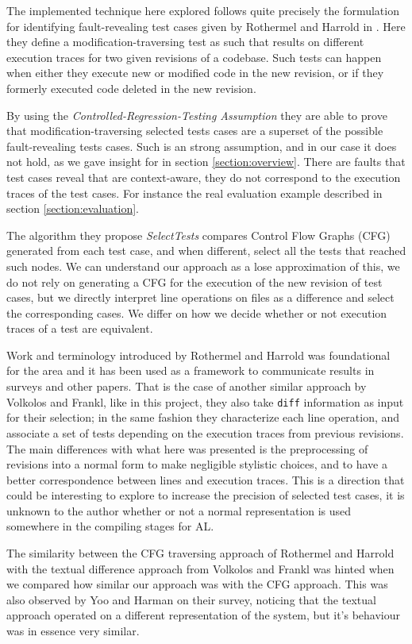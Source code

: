 \documentclass{article}
\begin{document}
The implemented technique here explored follows quite precisely the formulation for identifying fault-revealing test cases given by Rothermel and Harrold in \cite{TODO}. Here they define a modification-traversing test as such that results on different execution traces for two given revisions of a codebase. Such tests can happen when either they execute new or modified code in the new revision, or if they formerly executed code deleted in the new revision.

By using the \emph{Controlled-Regression-Testing Assumption} they are able to prove that modification-traversing selected tests cases are a superset of the possible fault-revealing tests cases. Such is an strong assumption, and in our case it does not hold, as we gave insight for in section \ref{section:overview}. There are faults that test cases reveal that are context-aware, they do not correspond to the execution traces of the test cases. For instance the real evaluation example described in section \ref{section:evaluation}.

The algorithm they propose \emph{SelectTests} compares Control Flow Graphs (CFG) generated from each test case, and when different, select all the tests that reached such nodes. We can understand our approach as a lose approximation of this, we do not rely on generating a CFG for the execution of the new revision of test cases, but we directly interpret line operations on files as a difference and select the corresponding cases. We differ on how we decide whether or not execution traces of a test are equivalent.

Work and terminology introduced by Rothermel and Harrold was foundational for the area and it has been used as a framework to communicate results in surveys and other papers. That is the case of another similar approach by Volkolos and Frankl, like in this project, they also take \texttt{diff} information as input for their selection; in the same fashion they characterize each line operation, and associate a set of tests depending on the execution traces from previous revisions. The main differences with what here was presented is the preprocessing of revisions into a normal form to make negligible stylistic choices, and to have a better correspondence between lines and execution traces. This is a direction that could be interesting to explore to increase the precision of selected test cases, it is unknown to the author whether or not a normal representation is used somewhere in the compiling stages for AL.

The similarity between the CFG traversing approach of Rothermel and Harrold with the textual difference approach from Volkolos and Frankl was hinted when we compared how similar our approach was with the CFG approach. This was also observed by Yoo and Harman on their survey, noticing that the textual approach operated on a different representation of the system, but it's behaviour was in essence very similar.
\end{document}
